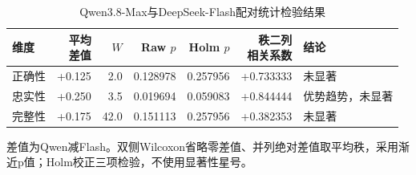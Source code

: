 \begin{table}[htbp]
\centering\footnotesize
\setlength{\tabcolsep}{4pt}
\caption{Qwen3.8-Max与DeepSeek-Flash配对统计检验结果}
\label{tab:cm-tests}
\begin{tabularx}{\linewidth}{lrrrrrX}
\toprule
维度 & \shortstack{平均\\差值} & $W$ & Raw $p$ & Holm $p$ & \shortstack{秩二列\\相关系数} & 结论 \\
\midrule
正确性 & +0.125 & 2.0 & 0.128978 & 0.257956 & +0.733333 & 未显著 \\
忠实性 & +0.250 & 3.5 & 0.019694 & 0.059083 & +0.844444 & 优势趋势，未显著 \\
完整性 & +0.175 & 42.0 & 0.151113 & 0.257956 & +0.382353 & 未显著 \\
\bottomrule
\end{tabularx}
\par\smallskip\raggedright 差值为Qwen减Flash。双侧Wilcoxon省略零差值、并列绝对差值取平均秩，采用渐近p值；Holm校正三项检验，不使用显著性星号。
\end{table}
